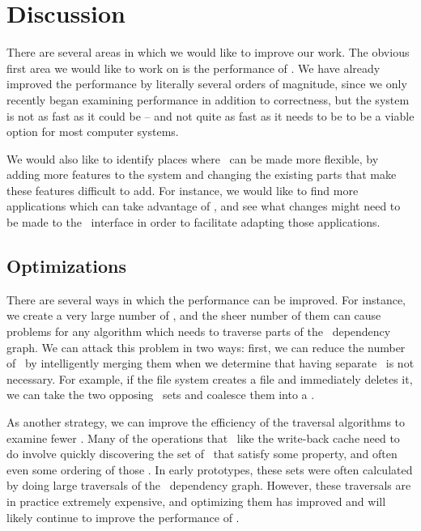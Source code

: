 \section {Discussion}
\label{sec:discussion}

There are several areas in which we would like to improve our work. The obvious
first area we would like to work on is the performance of \Kudos. We have
already improved the performance by literally several orders of magnitude, since
we only recently began examining performance in addition to correctness, but the
system is not as fast as it could be -- and not quite as fast as it needs to be
to be a viable option for most computer systems.

We would also like to identify places where \Kudos\ can be made more flexible,
by adding more features to the system and changing the existing parts that make
these features difficult to add. For instance, we would like to find more
applications which can take advantage of \opgroups, and see what changes might
need to be made to the \opgroup\ interface in order to facilitate adapting those
applications.

\subsection {Optimizations}
There are several ways in which the performance can be improved. For instance,
we create a very large number of \chdescs, and the sheer number of them can
cause problems for any algorithm which needs to traverse parts of the \chdesc\
dependency graph. We can attack this problem in two ways: first, we can reduce
the number of \chdescs\ by intelligently merging them when we determine that
having separate \chdescs\ is not necessary. For example, if the file system
creates a file and immediately deletes it, we can take the two opposing
\chdescs\ sets and coalesce them into a \noop.

As another strategy, we can improve the efficiency of the traversal algorithms
to examine fewer \chdescs. Many of the operations that \modules\ like the
write-back cache need to do involve quickly discovering the set of \chdescs\
that satisfy some property, and often even some ordering of those \chdescs. In
early prototypes, these sets were often calculated by doing large traversals of
the \chdesc\ dependency graph. However, these traversals are in practice
extremely expensive, and optimizing them has improved and will likely continue
to improve the performance of \Kudos.


